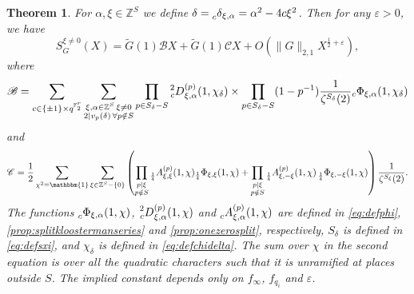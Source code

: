 \documentclass[10pt,oneside,reqno]{amsart}
\newcommand\FF{\mathbb{F}}
\newcommand\ZZ{\mathbb{Z}}
\newcommand\ms[1]{\mathscr{#1}}
\newcommand\triv{\mathbbm{1}}
\theoremstyle{THEOREM}
\newtheorem{theorem}{Theorem}[section]
\theoremstyle{DEFINITION}
\theoremstyle{EXERCISE}
\numberwithin{equation}{section}
\begin{document}
\begin{theorem}\label{thm:contributionxinot0}
For $\alpha,\xi\in \ZZ^S$ we define $\delta=\prescript{}{c}\delta_{\xi,\alpha}=\alpha^2-4c\xi^2$. Then for any $\varepsilon>0$, we have
\[
S_G^{\xi\neq 0}(X)=\widetilde{G}(1)\ms{B}X+\widetilde{G}(1)\ms{C}X+O(\|G\|_{2,1}X^{\frac{1}{2}+\varepsilon}),
\]
where
\[
  \ms{B}=\sum_{c\in \{\pm 1\}\times q^{\FF_2^r}}\sum_{\substack{\xi,\alpha\in \ZZ^S\, \xi\neq 0\\ 2\mid v_p(\delta)\,\forall p\notin S}}\prod_{p\in S_\delta-S}\prescript{2}{c}D_{\xi,\alpha}^{(p)}(1,\chi_\delta) \\
  \times\prod_{p\in S_\delta-S}(1-p^{-1})\frac{1}{\zeta^{S_\delta}(2)}{}_c \Phi_{\xi,\alpha}(1,\chi_\delta)
  \]
and
\[
  \ms{C}=\frac12\sum_{\chi^2=\triv}\sum_{\xi\in \ZZ^S-\{0\}}\left(\prod_{\substack{p\mid \xi\\ p\notin S}}\prescript{}{\frac14}A_{\xi,\xi}^{(p)}(1,\chi){}_\frac14 \Phi_{\xi,\xi}(1,\chi)+\prod_{\substack{p\mid \xi\\ p\notin S}}\prescript{}{\frac14}A_{\xi,-\xi}^{(p)}(1,\chi)\prescript{}{\frac14}\Phi_{\xi,-\xi}(1,\chi)\right) \frac{1}{\zeta^{S_{\xi}}(2)}.
\]
The functions $\prescript{}{c}\Phi_{\xi,\alpha}(1,\chi)$, $\prescript{2}{c}D_{\xi,\alpha}^{(p)}(1,\chi)$ and $\prescript{}{c}{A}_{\xi,\alpha}^{(p)}(1,\chi)$ are defined in \eqref{eq:defphi}, \autoref{prop:splitkloostermanseries} and \autoref{prop:onezerosplit}, respectively, $S_\delta$ is defined in \eqref{eq:defsxi}, and $\chi_\delta$ is defined in \eqref{eq:defchidelta}. The sum over $\chi$ in the second equation is over all the quadratic characters such that it is unramified at places outside $S$.
The implied constant depends only on $f_\infty$, $f_{q_i}$ and $\varepsilon$.
\end{theorem}
\end{document}
